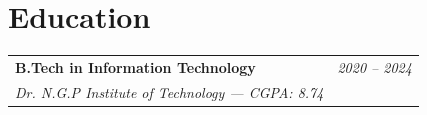 \documentclass[11pt, letterpaper]{article}
\begin{document}
\vspace{8pt}
\section{Education}
\noindent\begin{tabularx}{\textwidth}{@{}X r@{}}
    \fontsize{12}{14}\selectfont\textbf{B.Tech in Information Technology} & \fontsize{11}{13}\selectfont\textit{2020 -- 2024} \\
    \fontsize{11}{13}\selectfont\textit{Dr. N.G.P Institute of Technology --- CGPA: 8.74} &
\end{tabularx}

\vspace{8pt}
\end{document}
